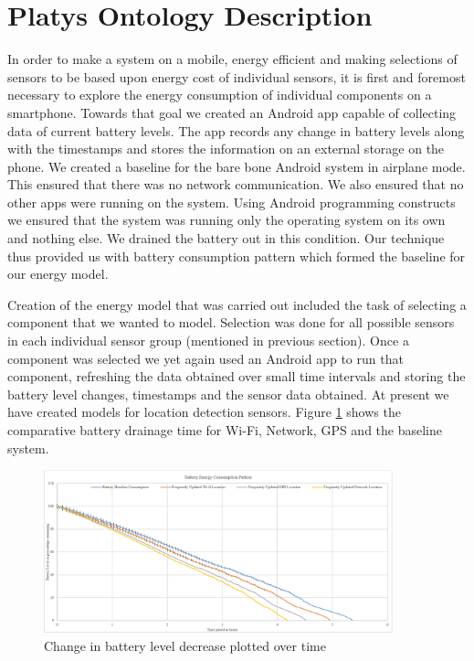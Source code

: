 \documentclass{ubicomp2013}
\begin{document}
\section{Platys Ontology Description}

In order to make a system on a mobile, energy efficient and making selections of sensors to be based upon energy cost of individual sensors, it is first and foremost necessary to explore the energy consumption of individual components on a smartphone. Towards that goal we created an Android app capable of collecting data of current battery levels. The app records any change in battery levels along with the timestamps and stores the information on an external storage on the phone. We created a baseline for the bare bone Android system in airplane mode. This ensured that there was no network communication. We also ensured that no other apps were running on the system. Using Android programming constructs we ensured that the system was running only the operating system on its own and nothing else. We drained the battery out in this condition. Our technique thus provided us with battery consumption pattern which formed the baseline for our energy model.

Creation of the energy model that was carried out included the task of selecting a component that we wanted to model. Selection was done for all possible sensors in each individual sensor group (mentioned in previous section). Once a component was selected we yet again used an Android app to run that component, refreshing the data obtained over small time intervals and storing the battery level changes, timestamps and the sensor data obtained. At present we have created models for location detection sensors. Figure \ref{fig:battery} shows the comparative battery drainage time for Wi-Fi, Network, GPS and the baseline system.
  
\begin{figure}[tbh]
\centering
\includegraphics[width=0.9\textwidth]{Battery_Consumption_Pattern.png}
\caption{Change in battery level decrease plotted over time}
\label{fig:battery}
\end{figure}
\end{document}
